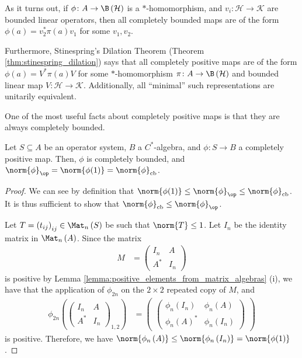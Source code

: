 \begin{remark}
  As it turns out, if $\phi\colon A\rightarrow \B\left( \mathcal{H} \right)$ is a $\ast$-homomorphism, and $v_i\colon \mathcal{H}\rightarrow \mathcal{K}$ are bounded linear operators, then all completely bounded maps are of the form $\phi\left( a \right) = v_2^{\ast}\pi(a)v_1$ for some $v_1,v_2$.\newline

  Furthermore, Stinespring's Dilation Theorem (Theorem \ref{thm:stinespring_dilation}) says that all completely positive maps are of the form $\phi\left( a \right) = V^{\ast}\pi(a)V$ for some $\ast$-homomorphism $\pi\colon A\rightarrow \B\left( \mathcal{H} \right)$ and bounded linear map $V\colon \mathcal{H}\rightarrow \mathcal{K}$. Additionally, all ``minimal'' such representations are unitarily equivalent.
\end{remark}
One of the most useful facts about completely positive maps is that they are always completely bounded.
\begin{proposition}\label{prop:norm_of_completely_positive_map}
  Let $S\subseteq A$ be an operator system, $B$ a $C^{\ast}$-algebra, and $\phi\colon S\rightarrow B$ a completely positive map. Then, $\phi$ is completely bounded, and $\norm{\phi}_{\op} = \norm{\phi(1)} = \norm{\phi}_{\cb}$.
\end{proposition}
\begin{proof}
  We can see by definition that $\norm{\phi(1)}\leq \norm{\phi}_{\op}\leq \norm{\phi}_{\cb}$. It is thus sufficient to show that $\norm{\phi}_{\cb}\leq \norm{\phi}_{\op}$.\newline

  Let $T = \left( t_{ij} \right)_{ij}\in \Mat_n\left( S \right)$ be such that $\norm{T}\leq 1$. Let $I_n$ be the identity matrix in $\Mat_n\left( A \right)$. Since the matrix
  \begin{align*}
    M &= \begin{pmatrix}I_n & A \\ A^{\ast} & I_n\end{pmatrix}
  \end{align*}
  is positive by Lemma \ref{lemma:positive_elements_from_matrix_algebras} (i), we have that the application of $\phi_{2n}$ on the $2\times 2$ repeated copy of $M$, and 
  \begin{align*}
    \phi_{2n}\left( \begin{pmatrix}I_n & A \\ A^{\ast} & I_n\end{pmatrix}_{1,2} \right) &= \begin{pmatrix} \begin{pmatrix}\phi_n\left( I_n \right) & \phi_n\left( A \right) \\ \phi_n\left( A \right)^{\ast} & \phi_n\left( I_n \right)\end{pmatrix}\end{pmatrix}
  \end{align*}
  is positive. Therefore, we have $\norm{\phi_n\left( A \right)}\leq \norm{\phi_n\left( I_n \right)} = \norm{\phi(1)}$.
\end{proof}
